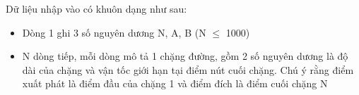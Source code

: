 Dữ liệu nhập vào có khuôn dạng như sau:
\begin{itemize}
	\item Dòng 1 ghi 3 số nguyên dương N, A, B (N  $\le$  1000)
	\item N dòng tiếp, mỗi dòng mô tả 1 chặng đường, gồm 2 số nguyên dương là độ dài của chặng và vận tốc giới hạn tại điểm nút cuối chặng. Chú ý rằng điểm xuất phát là điểm đầu của chặng 1 và điểm đích là điểm cuối chặng N
\end{itemize}

\